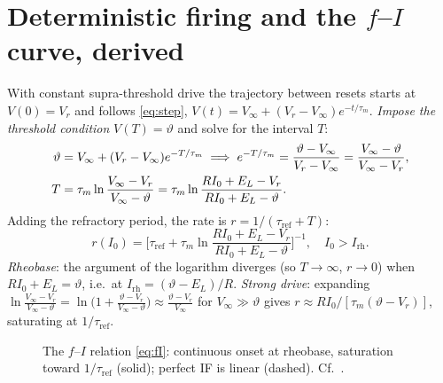 \documentclass[11pt]{article}
\begin{document}
\section{Deterministic firing and the $f$--$I$ curve, derived}
With constant supra-threshold drive the trajectory between resets starts at $V(0)=V_r$ and follows
\eqref{eq:step}, $V(t)=V_\infty+(V_r-V_\infty)e^{-t/\tau_m}$. \emph{Impose the threshold condition}
$V(T)=\vartheta$ and solve for the interval $T$:
\begin{align}
  \vartheta&=V_\infty+(V_r-V_\infty)e^{-T/\tau_m}
   \;\Longrightarrow\;
   e^{-T/\tau_m}=\frac{\vartheta-V_\infty}{V_r-V_\infty}=\frac{V_\infty-\vartheta}{V_\infty-V_r},\notag\\
  T&=\tau_m\ln\frac{V_\infty-V_r}{V_\infty-\vartheta}
   =\tau_m\ln\frac{RI_0+E_L-V_r}{RI_0+E_L-\vartheta}.
  \label{eq:isi}
\end{align}
Adding the refractory period, the rate is $r=1/(\tau_{\mathrm{ref}}+T)$:
\begin{equation}
  \boxed{\;r(I_0)=\Big[\tau_{\mathrm{ref}}+\tau_m\ln\frac{RI_0+E_L-V_r}{RI_0+E_L-\vartheta}\Big]^{-1},
  \quad I_0>I_{\mathrm{rh}}.\;}
  \label{eq:fI}
\end{equation}
\emph{Rheobase}: the argument of the logarithm diverges (so $T\to\infty$, $r\to0$) when
$RI_0+E_L=\vartheta$, i.e.\ at $I_{\mathrm{rh}}=(\vartheta-E_L)/R$. \emph{Strong drive}: expanding
$\ln\frac{V_\infty-V_r}{V_\infty-\vartheta}=\ln\!\big(1+\frac{\vartheta-V_r}{V_\infty-\vartheta}\big)
\approx\frac{\vartheta-V_r}{V_\infty}$ for $V_\infty\gg\vartheta$ gives $r\approx
RI_0/[\tau_m(\vartheta-V_r)]$, saturating at $1/\tau_{\mathrm{ref}}$.

\begin{figure}[h]
\centering
{}
\caption{The $f$--$I$ relation \eqref{eq:fI}: continuous onset at rheobase, saturation toward
$1/\tau_{\mathrm{ref}}$ (solid); perfect IF is linear (dashed). Cf.~\cite{gerstner2014,burkitt2006}.}
\end{figure}
\end{document}
